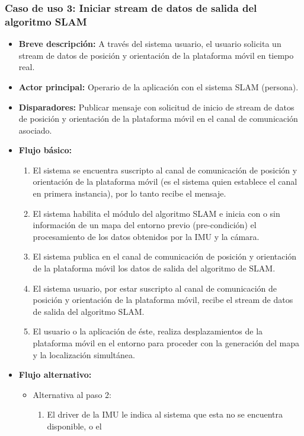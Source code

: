 \documentclass[12pt,a4paper, twosite]{article}
\begin{document}
\subsubsection*{Caso de uso 3: Iniciar stream de datos de salida del algoritmo SLAM}

\begin{itemize}
  \item \textbf{Breve descripción:} A través del sistema usuario, el usuario solicita un
  stream de datos de posición y orientación de la plataforma móvil en tiempo real.
  \item \textbf{Actor principal:} Operario de la aplicación con el sistema SLAM (persona).
  \item \textbf{Disparadores:} Publicar mensaje con solicitud de inicio de stream de datos de
  posición y orientación de la plataforma móvil en el canal de comunicación asociado.
  \item \textbf{Flujo básico:}
  \begin{enumerate}
    \item El sistema se encuentra suscripto al canal de comunicación de posición y orientación
    de la plataforma móvil (es el sistema quien establece el canal en primera instancia), por
    lo tanto recibe el mensaje.
    \item El sistema habilita el módulo del algoritmo SLAM e inicia con o sin información de un
    mapa del entorno previo (pre-condición) el procesamiento de los datos obtenidos por la IMU y
    la cámara.
    \item El sistema publica en el canal de comunicación de posición y orientación de la
    plataforma móvil los datos de salida del algoritmo de SLAM.
    \item El sistema usuario, por estar suscripto al canal de comunicación de posición y
    orientación de la plataforma móvil, recibe el stream de datos de salida del algoritmo SLAM.
    \item El usuario o la aplicación de éste, realiza desplazamientos de la plataforma móvil en
    el entorno para proceder con la generación del mapa y la localización simultánea.
  \end{enumerate}
  \item \textbf{Flujo alternativo:}
  \begin{itemize}
    \item Alternativa al paso 2:
    \begin{enumerate}
      \item El driver de la IMU le indica al sistema que esta no se encuentra disponible, o el

\end{enumerate}
\end{itemize}
\end{itemize}
\end{document}
